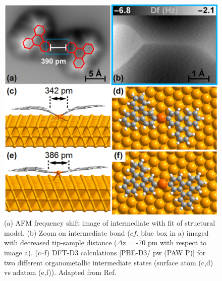 \documentclass[%
 reprint,
 amsmath,amssymb,
 aps,
prb,
floatfix,
]{revtex4-2}
\begin{document}
\begin{figure}[bt]
\centering
\includegraphics[width=0.75\columnwidth]{Fig/distance.png}
\caption{(a) AFM frequency shift image of intermediate with fit of structural model. (b) Zoom on intermediate bond ($cf$. blue box in a) imaged with decreased tip-sample distance ($\Delta$z = -70 pm with respect to image a). (c--f) DFT-D3 calculations [PBE-D3/ pw (PAW P)] for two different organometallic intermediate states (surface atom (c,d) vs adatom (e,f)). Adapted from Ref.~\cite{acsnano2017}}
\label{fig:adatom-CMC-evidence1}
\end{figure}
\end{document}
